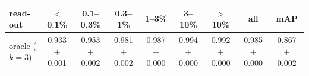 \begin{tabular}{lcccccccc}
\toprule
read-out & $<$0.1\% & 0.1--0.3\% & 0.3--1\% & 1--3\% & 3--10\% & $>$10\% & all & mAP \\
\midrule
oracle ($k=3$) & 0.933 $\pm$ 0.001 & 0.953 $\pm$ 0.002 & 0.981 $\pm$ 0.002 & 0.987 $\pm$ 0.000 & 0.994 $\pm$ 0.000 & 0.992 $\pm$ 0.000 & 0.985 $\pm$ 0.000 & 0.867 $\pm$ 0.002 \\
\bottomrule
\end{tabular}
